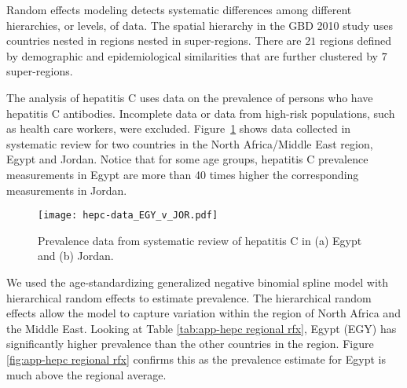 Random effects modeling detects systematic differences among different
hierarchies, or levels, of data.  The spatial hierarchy in the GBD
2010 study uses countries nested in regions nested in super-regions.
There are $21$ regions defined by demographic and epidemiological
similarities that are further clustered by $7$ super-regions.

The analysis of hepatitis C uses data on the prevalence of persons who
have hepatitis C antibodies.  Incomplete data or data from high-risk
populations, such as health care workers, were excluded.
Figure~\ref{fig:app-hepc data} shows data collected in systematic
review for two countries in the North Africa/Middle East region, Egypt
and Jordan.  Notice that for some age groups, hepatitis C prevalence
measurements in Egypt are more than 40 times higher the corresponding measurements in
Jordan.

    \begin{figure}[h]
        \begin{center}
            \texttt{[image: hepc-data\_EGY\_v\_JOR.pdf]}
            \caption{Prevalence data from systematic review of
              hepatitis C in (a) Egypt and (b) Jordan.}
            \label{fig:app-hepc data}
        \end{center}
    \end{figure}

We used the age-standardizing generalized negative binomial spline
model with hierarchical random effects to estimate prevalence.  The
hierarchical random effects allow the model to capture variation
within the region of North Africa and the Middle East.  Looking at
Table \ref{tab:app-hepc regional rfx}, Egypt (EGY) has significantly
higher prevalence than the other countries in the region.  Figure
\ref{fig:app-hepc regional rfx} confirms this as the prevalence
estimate for Egypt is much above the regional average.

